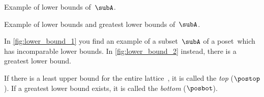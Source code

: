 \begin{solution}
    \begin{marginfigure}
        \centering
        \caption{
            Example of lower bounds of~$\subA$.
        }
        \label{fig:lower_bound_1}
    \end{marginfigure}

    \begin{marginfigure}
        \centering
        \caption{
            Example of lower bounds and greatest lower bounds of~$\subA$.
        }
        \label{fig:lower_bound_2}
    \end{marginfigure}

    In \cref{fig:lower_bound_1} you find an example of a subset~$\subA$ of a poset~\posA which has incomparable lower bounds.
    In \cref{fig:lower_bound_2} instead, there is a greatest lower bound.
\end{solution}

\begin{definition}
    \label{def:top}
    \label{def:bot}
    If there is a least upper bound for the entire lattice~\posA, it is called the \emph{top} ($\postop$).
    If a greatest lower bound exists, it is called the \emph{bottom} ($\posbot$).
\end{definition}
